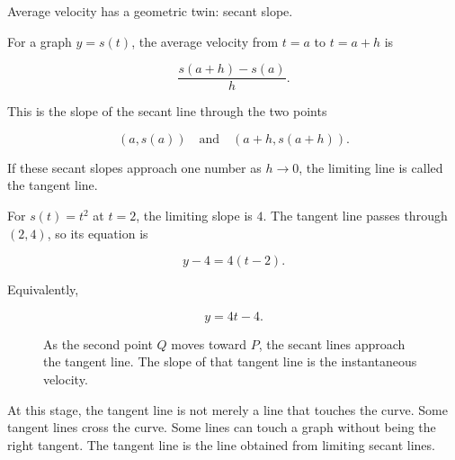 Average velocity has a geometric twin: secant slope.

For a graph \(y=s(t)\), the average velocity from \(t=a\) to \(t=a+h\) is

\[
\frac{s(a+h)-s(a)}{h}.
\]

This is the slope of the secant line through the two points

\[
(a,s(a))
\quad\text{and}\quad
(a+h,s(a+h)).
\]

If these secant slopes approach one number as \(h\to0\), the limiting line is called the tangent line.

For \(s(t)=t^2\) at \(t=2\), the limiting slope is \(4\). The tangent line passes through \((2,4)\), so its equation is

\[
y-4=4(t-2).
\]

Equivalently,

\[
y=4t-4.
\]

\begin{figure}[h]
\centering
{}
\caption{As the second point \(Q\) moves toward \(P\), the secant lines approach the tangent line. The slope of that tangent line is the instantaneous velocity.}
\label{fig:secants-to-tangent}
\end{figure}

At this stage, the tangent line is not merely a line that touches the curve. Some tangent lines cross the curve. Some lines can touch a graph without being the right tangent. The tangent line is the line obtained from limiting secant lines.

